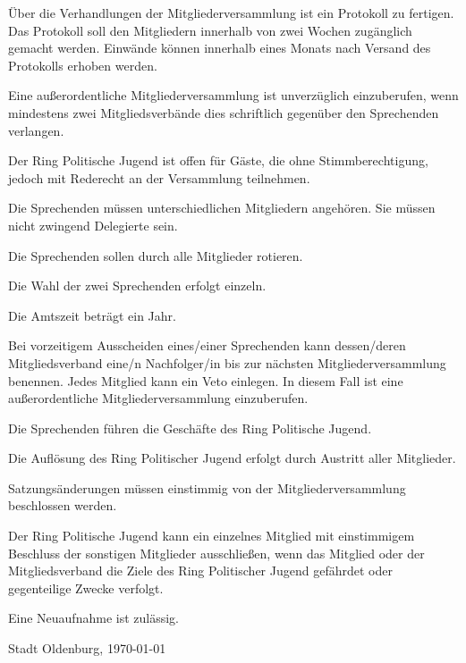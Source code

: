 \documentclass[10pt,a4paper,oneside,parskip=half]{scrartcl}
\begin{document}
\begin{contract}
Über die Verhandlungen der Mitgliederversammlung ist ein Protokoll zu fertigen. Das Protokoll soll den Mitgliedern innerhalb von zwei Wochen zugänglich gemacht werden. Einwände können innerhalb eines Monats nach Versand des Protokolls erhoben werden.

Eine außerordentliche Mitgliederversammlung ist unverzüglich einzuberufen, wenn mindestens zwei Mitgliedsverbände dies schriftlich gegenüber den Sprechenden verlangen.

Der Ring Politische Jugend ist offen für Gäste, die ohne Stimmberechtigung, jedoch mit Rederecht an der Versammlung teilnehmen.

Die Sprechenden müssen unterschiedlichen Mitgliedern angehören. Sie müssen nicht zwingend Delegierte sein.

Die Sprechenden sollen durch alle Mitglieder rotieren.

Die Wahl der zwei Sprechenden erfolgt einzeln.

Die Amtszeit beträgt ein Jahr.

Bei vorzeitigem Ausscheiden eines/einer Sprechenden kann dessen/deren Mitgliedsverband eine/n Nachfolger/in bis zur nächsten Mitgliederversammlung benennen. Jedes Mitglied kann ein Veto einlegen. In diesem Fall ist eine außerordentliche Mitgliederversammlung einzuberufen.

Die Sprechenden führen die Geschäfte des Ring Politische Jugend. 

Die Auflösung des Ring Politischer Jugend erfolgt durch Austritt aller Mitglieder.

Satzungsänderungen müssen einstimmig von der Mitgliederversammlung beschlossen werden.

Der Ring Politische Jugend kann ein einzelnes Mitglied mit einstimmigem Beschluss der sonstigen Mitglieder ausschließen, wenn das Mitglied oder der Mitgliedsverband die Ziele des Ring Politischer Jugend gefährdet oder gegenteilige Zwecke verfolgt.

Eine Neuaufnahme ist zulässig.

\end{contract}
\vspace{1cm}
Stadt Oldenburg, \today
\end{document}
